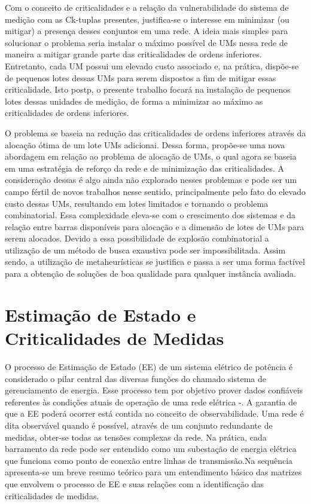 \documentclass[12pt]{article}
\begin{document}
Com o conceito de criticalidades e a relação da vulnerabilidade do sistema de medição com as Ck-tuplas presentes, justifica-se o interesse em minimizar (ou mitigar) a presença desses conjuntos em uma rede. A ideia mais simples para solucionar o problema seria instalar o máximo possível de UMs nessa rede de maneira a mitigar grande parte das criticalidades de ordens inferiores. Entretanto, cada UM possui um elevado custo associado e, na prática, dispõe-se de pequenos lotes dessas UMs para serem dispostos a fim de mitigar essas criticalidade. Isto postp, o presente trabalho focará na instalação de pequenos lotes dessas unidades de medição, de forma a minimizar ao máximo as criticalidades de ordens inferiores.

O problema se baseia na redução das criticalidades de ordens inferiores através da alocação ótima de um lote UMs adicionai. Dessa forma, propõe-se uma nova abordagem em relação ao problema de alocação de UMs, o qual agora se baseia em uma estratégia de reforço da rede e de minimização das criticalidades. A consideração dessas é algo ainda não explorado nesses problemas e pode ser um campo fértil de novos trabalhos nesse sentido, principalmente pelo fato do elevado custo dessas UMs, resultando em lotes limitados e tornando o problema combinatorial. Essa complexidade eleva-se com o crescimento dos sistemas e da relação entre barras disponíveis para alocação e a dimensão de lotes de UMs para serem alocados. Devido a essa possibilidade de explosão combinatorial a utilização de um método de busca exaustiva pode ser impossibilitada. Assim sendo, a utilização de metaheurísticas se justifica e passa a ser uma forma factível para a obtenção de soluções de boa qualidade para qualquer instância avaliada.

\section{Estimação de Estado e Criticalidades de Medidas}

O processo de Estimação de Estado (EE) de um sistema elétrico de potência é considerado o pilar central das diversas funções do chamado sistema de gerenciamento de energia. Esse processo tem por objetivo prover dados confiáveis referentes às condições atuais de operação de uma rede elétrica \cite{Abur04}-\cite{Mont99}. A garantia de que a EE poderá ocorrer está contida no conceito de observabilidade. Uma rede é dita observável quando é possível, através de um conjunto redundante de medidas, obter-se todas as tensões complexas da rede. Na prática, cada barramento da rede pode ser entendido como um subestação de energia elétrica que funciona como ponto de conexão entre linhas de transmissão.Na sequência apresenta-se um breve resumo teórico para um entendimento básico das matrizes que envolvem o processo de EE e suas relações com a identificação das criticalidades de medidas.
\end{document}
